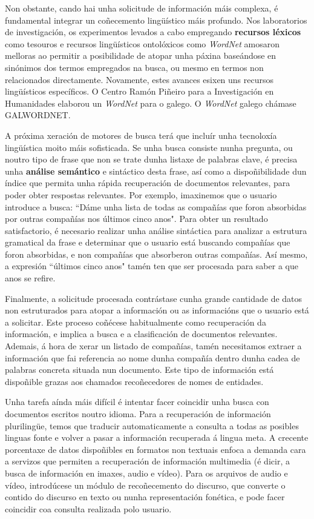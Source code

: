 \begin{multicols}{2}
Non obstante, cando hai unha solicitude de información máis complexa, é fundamental integrar un coñecemento lingüístico máis profundo. Nos laboratorios de investigación, os experimentos levados a cabo empregando \textbf{recursos léxicos} como tesouros e recursos lingüísticos ontolóxicos como \textit{WordNet} amosaron melloras ao permitir a posibilidade de atopar unha páxina baseándose en sinónimos dos termos empregados na busca, ou mesmo en termos non relacionados directamente. Novamente, estes avances esixen uns recursos lingüísticos específicos. O Centro Ramón Piñeiro para a Investigación en Humanidades \cite{GAL-Nota24} elaborou un \textit{WordNet} para o galego. O \textit{WordNet} galego chámase GALWORDNET.

A próxima xeración de motores de busca terá que incluír unha tecnoloxía lingüística moito máis sofisticada. Se unha busca consiste nunha pregunta, ou noutro tipo de frase que non se trate dunha listaxe de palabras clave, é precisa unha \textbf{análise semántico} e sintáctico desta frase, así como a dispoñibilidade dun índice que permita unha rápida recuperación de documentos relevantes, para poder obter respostas relevantes. Por exemplo, imaxinemos que o usuario introduce a busca: “Dáme unha lista de todas as compañías que foron absorbidas por outras compañías nos últimos cinco anos". Para obter un resultado satisfactorio, é necesario realizar unha análise sintáctica para analizar a estrutura gramatical da frase e determinar que o usuario está buscando compañías que foron absorbidas, e non compañías que absorberon outras compañías. Así mesmo, a expresión “últimos cinco anos" tamén ten que ser procesada para saber a que anos se refire. 

Finalmente, a solicitude procesada contrástase cunha grande cantidade de datos non estruturados para atopar a información ou as informacións que o usuario está a solicitar. Este proceso coñécese habitualmente como recuperación da información, e implica a busca e a clasificación de documentos relevantes. Ademais, á hora de xerar un listado de compañías, tamén necesitamos extraer a información que fai referencia ao nome dunha compañía dentro dunha cadea de palabras concreta situada nun documento. Este tipo de información está dispoñible grazas aos chamados recoñecedores de nomes de entidades. 

Unha tarefa aínda máis difícil é intentar facer coincidir unha busca con documentos escritos noutro idioma. Para a recuperación de información plurilingüe, temos que traducir automaticamente a consulta a todas as posibles linguas fonte e volver a pasar a información recuperada á lingua meta. A crecente porcentaxe de datos dispoñibles en formatos non textuais enfoca a demanda cara a servizos que permiten a recuperación de información multimedia (é dicir, a busca de información en imaxes, audio e vídeo). Para os arquivos de audio e vídeo, introdúcese un módulo de recoñecemento do discurso, que converte o contido do discurso en texto ou nunha representación fonética, e pode facer coincidir coa consulta realizada polo usuario.


\end{multicols}
